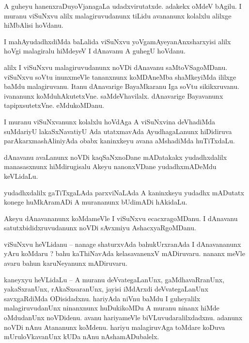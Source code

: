 \documentclass{article}
\begin{document}
\begin{mn}%
A guheyu hanenxraDuyoVjanagaLa udadxvirutatxde. adakekx oMdeV bAgilu. I muranu viSuNxvu alilx malagiruvudanunx tiLidu avananunx kolalxlu alilxge hiMbAlisi hoVdanu.
\end{mn}

\begin{mn}%
I mahAyudadhxdiMda baLalida viSuNxvu yoVgamAyeyanAnxsharxyisi alilx hoVgi malagiralu hiMdeyeV I dAnavanu A guhegU hoVdanu.
\end{mn}

\begin{mn}%
alilx I viSuNxvu malagiruvudanunx noVDi dAnavanu saMtoVSagoMDanu. viSuNxvu soVtu inunxmeVle tananxnunx koMDAneMba shaMkeyiMda ililxge baMdu malagiruvanu. Itanu dAnavarige BayaMkaranu Iga soVtu sikikxruvanu. ivananunx koMduhAkutetxVne. saMdeVhavilalx. dAnavarige Bayavanunx tapipxsutetxVne. eMdukoMDanu.
\end{mn}

\begin{mn}%
I muranu viSuNxvanunx kolalxlu hoVdAga A viSuNxvina deVhadiMda suMdariyU lakaSxNavatiyU Ada 
utatxmavAda AyudhagaLanunx hiDidiruva parAkarxmashAliniyAda obabx kaninxkeyu avana aMshadiMda 
huTiTxdaLu.
\end{mn}

\begin{mn}%
dAnavanu avaLanunx noVDi kaqSaNxnoDane mADatakakx yudadhxdalilx manasasxnunx hiMdirugisalu Akeyu 
nanonxVDane yudadhxmADeMdu keVLidaLu.
\end{mn}

\begin{mn}%
yudadhxdalilx gaTiTxgaLAda parxviNaLAda A kaninxkeyu yudadhx mADutatx konege huMkAramADi A 
murananunx bUdimADi hAkidaLu.
\end{mn}

\begin{mn}%
Akeyu dAnavananunx koMdameVle I viSuNxvu ecacxragoMDanu. I dAnavanu satutxbididxruvudanunx noVDi 
sAvxmiyu AshacxyaRgoMDanu.
\end{mn}

\begin{mn}%
viSuNxvu heVLidanu -- nanage shaturxvAda bahukUrxranAda I dAnavananunx yAru koMdaru ? bahu 
kaThiNavAda kelasavanenxV mADiruvaru. nananx meVle avaru bahun karuNeyanunx mADiruvaru.
\end{mn}

\begin{mn}%
kaneyxyu heVLidaLu -- A muranu deVvategaLanUnx, gaMdhavaRranUnx, yakaSxranUnx, rAkaSxsaranUnx, 
jayisi iMdArxdi deVvategaLanUnx savxgaRdiMda ODisidadxnu. hariyAda niVnu  baMdu I guheyalilx 
malagiruvudanUnx ninanxnunx huDukikoMDu A muranu ninanx hiMde oMdudanUnx noVDidenu. avanu 
hariyameVle biVLuvudaralilxdadxnu. adanunx noVDi nAnu Atananunx koMdenu. hariyu malagiruvAga 
toMdare koDuva mUruloVkavanUnx kUDa nAnu nAshamADubalelx.
\end{mn}
\end{document}
